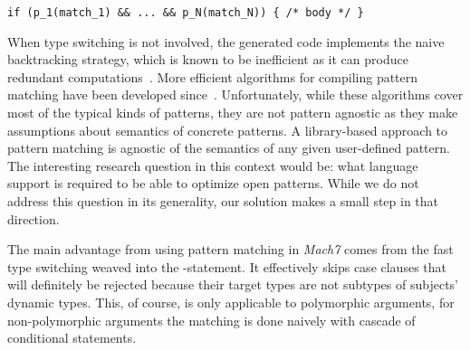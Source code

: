\begin{lstlisting}
if (p_1(match_1) && ... && p_N(match_N)) { /* body */ }
\end{lstlisting}

\noindent
When type switching is not involved, the generated code implements the naive 
backtracking strategy, which is known to be inefficient as it can produce 
redundant computations~\cite[]{Cardelli84}. More efficient 
algorithms for compiling pattern matching have been developed 
since~\cite{Augustsson85,Maranget92,Puel93,OPM01,Maranget08}. Unfortunately, while these 
algorithms cover most of the typical kinds of patterns, they are not pattern agnostic 
as they make assumptions about semantics of concrete patterns. A library-based 
approach to pattern matching is agnostic of the semantics of any given 
user-defined pattern. The interesting research question in this context would 
be: what language support is required to be able to optimize open patterns. 
While we do not address this question in its generality, our solution makes a 
small step in that direction.

The main advantage from using pattern matching in \emph{Mach7} comes from the fast type 
switching weaved into the -statement. It effectively skips case 
clauses that will definitely be rejected because their target types are not 
subtypes of subjects' dynamic types. This, of course, is only applicable to 
polymorphic arguments, for non-polymorphic arguments the matching is done 
naively with cascade of conditional statements.
